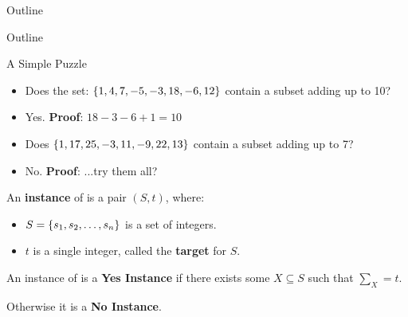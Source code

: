 \documentclass[c]{beamer}
\begin{document}
\begin{frame}{Outline}
  \begin{center}
    \scaletopagewidth{\outlinealmostfinal}
  \end{center}
\end{frame}

\begin{frame}{Outline}
  \begin{center}
    \scaletopagewidth{\outlinefinal}
  \end{center}
\end{frame}

\begin{frame}{A Simple Puzzle}
  
  \begin{itemize}
    \setlength{\itemsep}{4mm}
  \item[] Does the set: $\{1,4,7,-5,-3,18,-6,12\}$ contain
    a subset adding up to 10? \pause
  \item[] Yes.  \textbf{Proof}: $18 - 3 - 6 + 1 = 10$ \pause
  \item[] Does $\{1, 17, 25, -3, 11, -9, 22, 13\}$ contain a subset
    adding up to 7?\pause
  \item[] No.  \textbf{Proof}: ...try them all? 
  \end{itemize}
  
\end{frame}

\begin{frame}{\subsum{}}

  An \textbf{instance} of \subsum{} is a pair $(S, t)$, where:

    \begin{itemize}
    \item $S = \{s_1, s_2, \ldots, s_n\}$ is a set of integers.
    \item $t$ is a single integer, called the \textbf{target} for $S$.
    \end{itemize}\pause

    \vspace{\baselineskip}

    An instance of \subsum{} is a \textbf{Yes Instance} if
    there exists some $X \subseteq S$ such that $\sum_X = t$.

    \vspace{\baselineskip}
    
    Otherwise it is a \textbf{No Instance}.
\end{frame}
\end{document}
